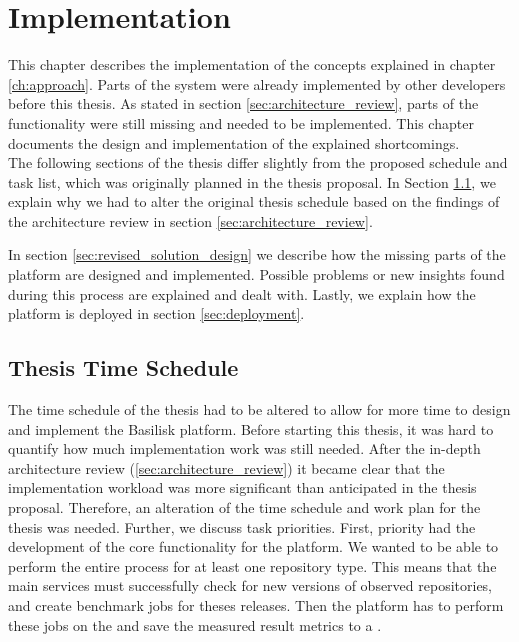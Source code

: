 \chapter{Implementation}
\label{ch:implementation}
This chapter describes the implementation of the concepts explained in chapter \ref{ch:approach}.
Parts of the system were already implemented by other developers before this thesis.
As stated in section \ref{sec:architecture_review}, parts of the functionality were still missing and needed to be implemented.
This chapter documents the design and implementation of the explained shortcomings.
\\

The following sections of the thesis differ slightly from the proposed schedule and task list, which was originally planned in the thesis proposal.
In Section \ref{sec:time_schedule}, we explain why we had to alter the original thesis schedule based on the findings of the architecture review in section \ref{sec:architecture_review}.

In section \ref{sec:revised_solution_design} we describe how the missing parts of the platform are designed and implemented.
Possible problems or new insights found during this process are explained and dealt with.
Lastly, we explain how the platform is deployed in section \ref{sec:deployment}.



\section{Thesis Time Schedule}
\label{sec:time_schedule}
The time schedule of the thesis had to be altered to allow for more time to design and implement the Basilisk platform.
Before starting this thesis, it was hard to quantify how much implementation work was still needed.
After the in-depth architecture review (\ref{sec:architecture_review}) it became clear that the implementation workload was more significant than anticipated in the thesis proposal.
Therefore, an alteration of the time schedule and work plan for the thesis was needed.
Further, we discuss task priorities.
First, priority had the development of the core functionality for the platform.
We wanted to be able to perform the entire process for at least one repository type.
This means that the main services must successfully check for new versions of observed repositories, and create benchmark jobs for theses releases. 
Then the platform has to perform these jobs on the \tsp{} and save the measured result metrics to a \ts{}.

